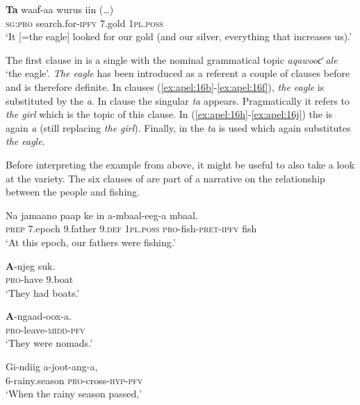 \documentclass[output=paper
,newtxmath
,modfonts
,nonflat]{langsci/langscibook}
\begin{document}
\ex\label{ex:apel:16k}
\gll \textbf{Ta} waaƭ-aa wurus iin (…)\\
     \textsc{sg:pro} search.for\textsc{-ipfv} \textsc{7.}gold \textsc{1pl.poss}\\
\glt ‘It [=the eagle] looked for our gold (and our silver, everything that increases us).’
\z
\z

The first clause in  is a single  with the nominal grammatical  topic \textit{aqawooƈ ale} ‘the eagle’. \textit{The eagle} has been introduced as a referent a couple of clauses before and is therefore definite. In clauses (\ref{ex:apel:16b}-\ref{ex:apel:16f}), \textit{the eagle} is substituted by the  \textit{a}. In clause  the singular  \textit{ta} appears. Pragmatically it refers to \textit{the girl} which is the topic of this clause. In (\ref{ex:apel:16h}-\ref{ex:apel:16j}) the  is again \textit{a} (still replacing \textit{the girl}). Finally, in  the  \textit{ta} is used which again substitutes \textit{the eagle}.

Before interpreting the example from  above, it might be useful to also take a look at the  variety. The six clauses of  are part of a narrative on the relationship between the  people and fishing.


\ea\label{ex:apel:17}
{  \citep[356]{Renaudier2012}}
\ea\label{ex:apel:17a}
\gll   Na jamaano paap ke in a-mbaal-eeg-a mbaal.\\
     \textsc{prep} 7.epoch 9.father 9.\textsc{def} \textsc{1pl.poss} \textsc{pro}-fish-\textsc{pret-ipfv} fish\\
\glt ‘At this epoch, our fathers were fishing.’
 

\ex\label{ex:apel:17b}
\gll \textbf{A}-njeg suk.\\
     \textsc{pro}-have \textsc{9.}boat \\
\glt ‘They had boats.’
 

\ex\label{ex:apel:17c}
\gll \textbf{A}-ngaad-oox-a.         \\
     \textsc{pro-}leave-\textsc{midd-pfv} \\
\glt ‘They were nomads.’   
 
\ex\label{ex:apel:17d}
\gll Gi-ndiig a-joot-ang-a,  \\
     \textsc{6-}rainy.season \textsc{pro-}cross\textsc{-hyp-pfv}    \\
\glt ‘When the rainy season passed,’
 
\end{document}
